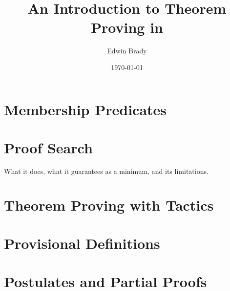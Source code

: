 \title{An Introduction to Theorem Proving in \Idris{}}
\author{Edwin Brady}
\date{\origdate\today}



\maketitle
\tableofcontents
\newpage






\section{Membership Predicates}

\section{Proof Search}

What it does, what it guarantees as a minimum, and its limitations.

\section{Theorem Proving with Tactics}

\section{Provisional Definitions}

\section{Postulates and Partial Proofs}




\appendix



